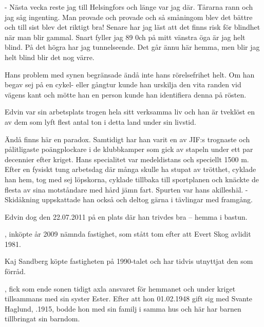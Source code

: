 - Nästa vecka reste jag till Helsingfors och länge var jag där. Tårarna rann och jag såg ingenting. Man provade och provade och så småningom blev det bättre och till sist blev det riktigt bra! Senare har jag läst att det finns risk för blindhet när man blir gammal. Snart fyller jag 89 0ch på mitt vänstra öga är jag helt blind. På det högra har jag tunnelseende. Det går ännu här hemma, men blir jag helt blind blir det nog värre.

Hans problem med synen begränsade ändå inte hans rörelsefrihet helt. Om han begav sej på en cykel- eller gångtur kunde han urskilja den vita randen vid vägens kant och mötte han en person kunde han identifiera denna på rösten.

Edvin var sin arbetsplats trogen hela sitt verksamma liv och han är tveklöst en av dem som lyft flest antal ton i detta land under sin livstid.

Ändå finns här en paradox. Samtidigt har han varit en av JIF:s trognaste och pålitligaste poängplockare i de klubbkamper som gick av stapeln under ett par decennier efter kriget. Hans specialitet var medeldistans och speciellt 1500 m. Efter en fysiskt tung arbetsdag där många skulle ha stupat av trötthet, cyklade han hem, tog med sej löpskorna, cyklade tillbaka till sportplanen och knäckte de flesta av sina motståndare med  hård jämn fart. Spurten var hans akilleshäl. - Skidåkning uppskattade han också och deltog gärna i tävlingar med framgång.

Edvin dog den 22.07.2011 på en plats där han trivdes bra – hemma i bastun.



, inköpte år 2009 nämnda fastighet, som stått tom efter att Evert Skog avlidit 1981.


Kaj Sandberg köpte fastigheten på 1990-talet och har tidvis utnyttjat den som förråd.



, fick som ende sonen tidigt axla ansvaret för hemmanet och under kriget tillsammans med sin syster Ester. Efter att hon 01.02.1948 gift sig med Svante Haglund, .1915, bodde hon med sin familj i samma hus och här har barnen tillbringat sin barndom.
\begin{jhchildren}
  \item {}
  \item {}
  \item {}
  \item {}
  \item {}
\end{jhchildren}


